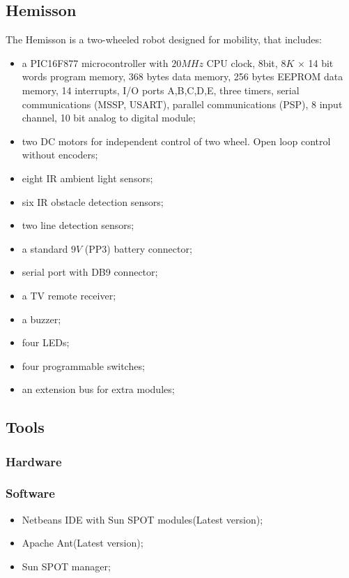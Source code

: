 \documentclass[a4paper,10pt]{article} %
\begin{document}

\subsection{Hemisson} %
\label{sub:Hemisson}

The Hemisson is a two-wheeled robot designed for mobility, that includes:
\begin{itemize}
    \item a PIC16F877 microcontroller with $20MHz$ CPU clock, 8bit,
    $8K$ $\times$ 14 bit words program memory, 368 bytes data memory, 256 bytes
    EEPROM data memory, 14 interrupts, I/O ports A,B,C,D,E, three timers,
    serial communications (MSSP, USART), parallel communications (PSP), 8
    input channel, 10 bit analog to digital module;
    \item two DC motors for independent control of two wheel. Open loop
    control without encoders;
    \item eight IR ambient light sensors;
    \item six IR obstacle detection sensors;
    \item two line detection sensors;
    \item a standard $9V$ (PP3) battery connector;
    \item serial port with DB9 connector;
    \item a TV remote receiver;
    \item a buzzer;
    \item four LEDs;
    \item four programmable switches;
    \item an extension bus for extra modules;
\end{itemize}


\subsection{Tools} %


\subsubsection{Hardware} %


\subsubsection{Software} %
\begin{itemize}
    \item Netbeans IDE with Sun SPOT modules(Latest version);
    \item Apache Ant(Latest version);
    \item Sun SPOT manager;
\end{itemize}





\end{document}
